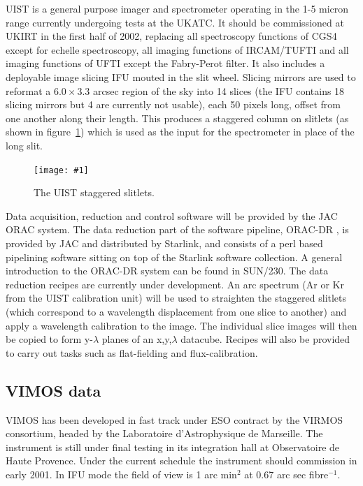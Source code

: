 \documentclass[twoside,11pt]{article}
\newcommand{\htmladdnormallink}[2]{#1}
\newcommand{\htmladdimg}[1]{}
\newcommand{\xref}[3]{#1}
\newcommand{\xlabel}[1]{}
\newcommand{\myfig} [5] {
  \begin{figure}
    \centering\texttt{[image: \#1]}
    \typeout{#1 inserted on page \arabic{page}}
    \caption{\label{#4}#5}
  \end{figure}
  }
\newcommand{\myfig}[5]{
    \label{#4} \htmladdimg{#3}\\
    Figure: #5\\
    }
\begin{document}
UIST is a general purpose imager and spectrometer operating in the 1-5
micron range currently undergoing tests at the UKATC. It should be
commissioned at UKIRT in the first half of 2002, replacing all
spectroscopy functions of CGS4 except for echelle spectroscopy, all
imaging functions of IRCAM/TUFTI and all imaging functions of UFTI
except the Fabry-Perot filter. It also includes a deployable image slicing
IFU mouted in the slit wheel. Slicing mirrors are used to reformat a $6.0\times3.3$
arcsec region of the sky into 14 slices (the IFU contains 18 slicing
mirrors but 4 are currently not usable), each 50 pixels long, offset
from one another along their length. This produces a staggered column
on slitlets (as shown in figure~\ref{sc16_uist_fig}) which is used as 
the input for the spectrometer in place of the long slit.

\myfig{sc16_uist.eps}{height=0.4\textheight}{sc16_uist.gif}{sc16_uist_fig}{The  UIST staggered slitlets.} 

Data acquisition, reduction and control software will be provided by
the JAC ORAC system. The data reduction part of the software pipeline,
ORAC-DR , is provided by JAC and distributed by Starlink, and consists
of a perl based pipelining software sitting on top of the Starlink
software collection. A general introduction to the ORAC-DR system can
be found in \xref{SUN/230}{sun230}{}. The data reduction recipes are 
currently under development. An arc spectrum (Ar or Kr from the UIST 
calibration unit) will be used to straighten the staggered slitlets (which
correspond to a wavelength displacement from one slice to another) and apply 
a wavelength calibration to the image. The individual slice images will
then be copied to form y-$\lambda$ planes of an x,y,$\lambda$ datacube.
Recipes will also be provided to carry out tasks such as flat-fielding
and flux-calibration.


\subsection{\xlabel{sc16_vimos}VIMOS data\label{sc16_vimos}}

\htmladdnormallink{VIMOS}{http://www.eso.org/instruments/vimos/} has been developed in fast track under ESO contract by the VIRMOS consortium, headed by the Laboratoire d'Astrophysique de Marseille. The instrument is still under final testing in its integration hall at Observatoire de Haute Provence. Under the current schedule the instrument should commission in early 2001. In IFU mode the field of view is 1 arc min$^{2}$ at 0.67 arc sec fibre$^{-1}$. 
\end{document}
